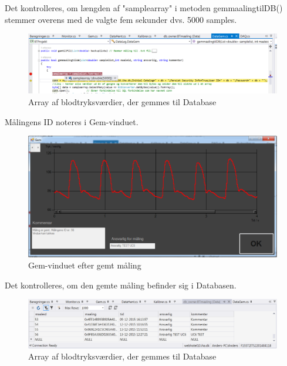 Det kontrolleres, om længden af "samplearray" i metoden gemmaalingtilDB() stemmer overens med de valgte fem sekunder dvs. 5000 samples.

\begin{figure}[H]
	\centering
	\includegraphics[width=1\textwidth]{Figurer/UC6_Samplearray}
	\caption{Array af blodtryksværdier, der gemmes til Database}
\end{figure}

Målingens ID noteres i Gem-vinduet.

\begin{figure}[H]
	\centering
	\includegraphics[width=1\textwidth]{Figurer/UC6_MalSuc}
	\caption{Gem-vinduet efter gemt måling}
\end{figure}


Det kontrolleres, om den gemte måling befinder sig i Databasen. 

\begin{figure}[H]
	\centering
	\includegraphics[width=1\textwidth]{Figurer/UC6_Database2}
	\caption{Array af blodtryksværdier, der gemmes til Database}
\end{figure}





